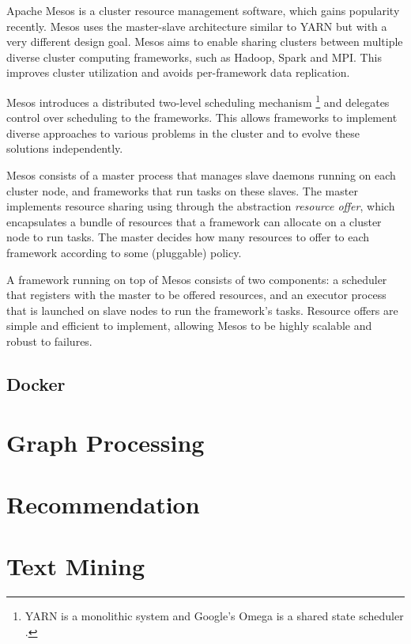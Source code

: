 \documentclass[11pt]{book}
\begin{document}
Apache Mesos \cite{Hindman:2011:MPF} is a cluster resource management software, which gains popularity recently. Mesos uses the master-slave architecture similar to YARN but with a very different design goal. Mesos aims to enable sharing clusters between multiple diverse cluster computing frameworks, such as Hadoop, Spark and MPI. This improves cluster utilization and avoids per-framework data replication.

Mesos introduces a distributed two-level scheduling mechanism \footnote{YARN is a monolithic system and Google's Omega is a shared state scheduler \cite{Schwarzkopf:2013:OFS}.} and delegates control over scheduling to the frameworks. This allows frameworks to implement diverse approaches to various problems in the cluster and to evolve these solutions independently.

Mesos consists of a master process that manages slave daemons running on each cluster node, and frameworks that run tasks on these slaves.
The master implements resource sharing using through the abstraction {\em resource offer}, which encapsulates a bundle of resources that a framework can allocate on a cluster node to run tasks. The master decides how many resources to offer to each framework according to some (pluggable) policy.

A framework running on top of Mesos consists of two components: a scheduler that registers with the master to be offered resources, and an executor process that is launched on slave nodes to run the framework's tasks.
Resource offers are simple and efficient to implement, allowing Mesos to be highly scalable and robust to failures.

\section[Docker]
{Docker}

\chapter[Graph Processing]
{Graph Processing}

\chapter[Recommendation]
{Recommendation}

\chapter[Text Mining]
{Text Mining}
\end{document}

